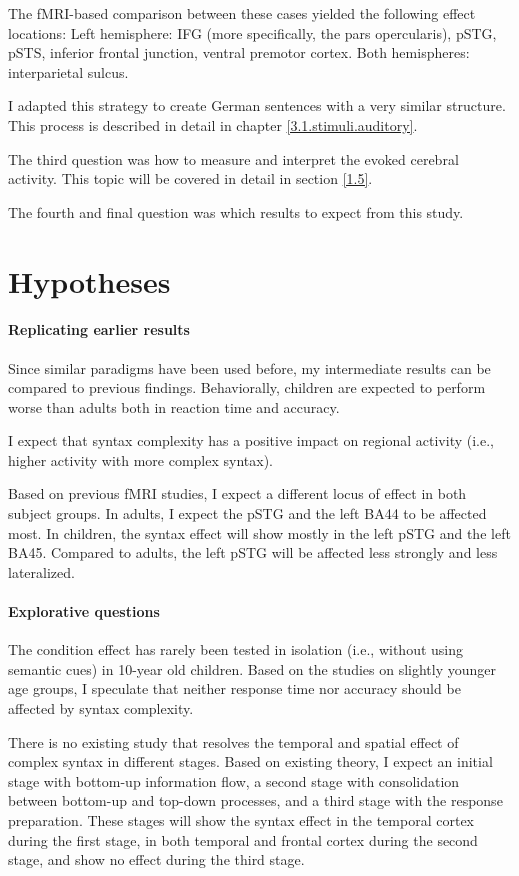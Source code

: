 The fMRI-based comparison between these cases yielded the following effect locations:
Left hemisphere: IFG (more specifically, the pars opercularis), pSTG, pSTS, inferior frontal junction, ventral premotor cortex.
Both hemispheres: interparietal sulcus.

I adapted this strategy to create German sentences with a very similar structure.
This process is described in detail in chapter \ref{3.1.stimuli.auditory}.


The third question was how to measure and interpret the evoked cerebral activity.
This topic will be covered in detail in section \ref{1.5}.


The fourth and final question was which results to expect from this study.
\section{Hypotheses}

\paragraph{Replicating earlier results}
Since similar paradigms have been used before, my intermediate results can be compared to previous findings.
Behaviorally, children are expected to perform worse than adults both in reaction time and accuracy.

I expect that syntax complexity has a positive impact on regional activity (i.e., higher activity with more complex syntax).

Based on previous fMRI studies, I expect a different locus of effect in both subject groups.
In adults, I expect the pSTG and the left BA44 to be affected most.
In children, the syntax effect will show mostly in the left pSTG and the left BA45.
Compared to adults, the left pSTG will be affected less strongly and less lateralized.

\paragraph{Explorative questions}
The condition effect has rarely been tested in isolation (i.e., without using semantic cues) in 10-year old children.
Based on the studies on slightly younger age groups, I speculate that neither response time nor accuracy should be affected by syntax complexity.

There is no existing study that resolves the temporal and spatial effect of complex syntax in different stages.
Based on existing theory, I expect an initial stage with bottom-up information flow, a second stage with consolidation between bottom-up and top-down processes, and a third stage with the response preparation.
These stages will show the syntax effect in the temporal cortex during the first stage, in both temporal and frontal cortex during the second stage, and show no effect during the third stage.

